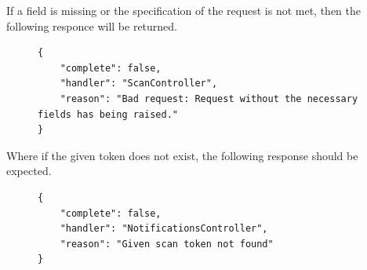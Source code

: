 					If a field is missing or the specification of the request is not met, then the following responce will be returned.
					\begin{figure}[H]
						\iftrue
						\begin{lstlisting}[]
{
	"complete": false,
	"handler": "ScanController",
	"reason": "Bad request: Request without the necessary fields has being raised."
}					
						\end{lstlisting}
					\end{figure}
					Where if the given token does not exist, the following response should be expected.
					\begin{figure}[H]
						\iftrue
						\begin{lstlisting}[]
{
	"complete": false,
	"handler": "NotificationsController",
	"reason": "Given scan token not found"
}		
						\end{lstlisting}
					\end{figure}
				
				
				
					
